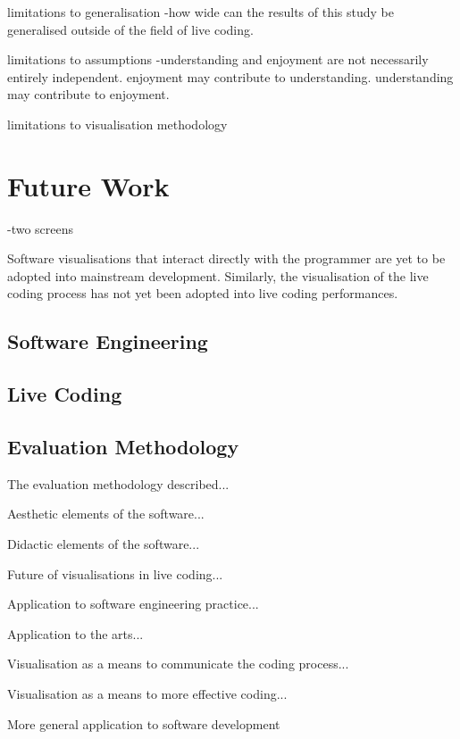 limitations to generalisation
-how wide can the results of this study be generalised outside of the field of live coding.

limitations to assumptions
-understanding and enjoyment are not necessarily entirely independent. enjoyment may contribute to understanding. understanding may contribute to enjoyment.

limitations to visualisation methodology

\section{Future Work}

-two screens

Software visualisations that interact directly with the programmer are yet to be adopted into mainstream development. Similarly, the visualisation of the live coding process has not yet been adopted into live coding performances.

\subsection{Software Engineering}


\subsection{Live Coding}


\subsection{Evaluation Methodology}

The evaluation methodology described...



Aesthetic elements of the software...

Didactic elements of the software...

Future of visualisations in live coding...

Application to software engineering practice...

Application to the arts...

Visualisation as a means to communicate the coding process...

Visualisation as a means to more effective coding...

More general application to software development


